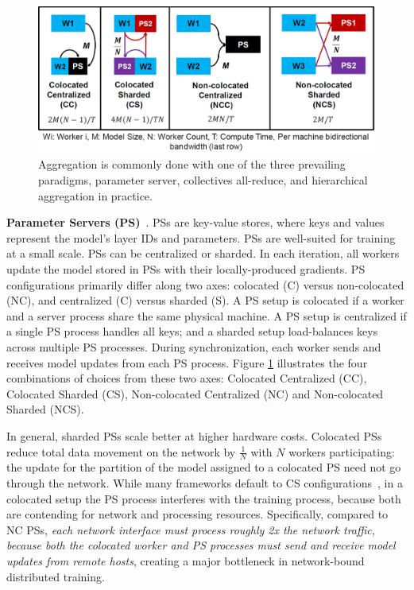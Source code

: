 \begin{figure}[t!]
	\centering
	\includegraphics[width=.7\linewidth, trim=2 3 3 3,clip]{Figures/pssetups.PNG}
	\caption{Aggregation is commonly done with one of the three prevailing paradigms, parameter server, collectives all-reduce, and hierarchical aggregation in practice.}
	\label{fig:pssetups}
\end{figure}

\noindent\textbf{Parameter Servers (PS)}~\cite{ps0,ps1,ps2,ps3, phubsocc, phubsysml, poseidon,cui2016geeps}. %
PSs are key-value stores, where keys and values represent the model's layer IDs and parameters. PSs are well-suited for training at a small scale. PSs can be centralized or sharded. In each iteration, all workers update the model stored in PSs with their locally-produced gradients. PS configurations primarily differ along two axes: colocated (C) versus non-colocated (NC), and centralized (C) versus sharded (S). %
A PS setup is colocated if a worker and a server process share the same physical machine. A PS setup is centralized if a single PS process handles all keys; and a sharded setup load-balances keys across multiple PS processes.
During synchronization, each worker sends and receives model updates from each PS process. Figure \ref{fig:pssetups} illustrates the four combinations of choices from these two axes: Colocated Centralized (CC), Colocated Sharded (CS), Non-colocated Centralized (NC) and Non-colocated Sharded (NCS).

In general, sharded PSs scale better at higher hardware costs. Colocated PSs reduce total data movement on the network by $\frac{1}{N}$ with $N$ workers participating: the update for the partition of the model assigned to a colocated PS need not go through the network. While many frameworks default to CS configurations~\cite{MXNetont0:online, Distribu25:online}, in a colocated setup the PS process interferes with the training process, because both are contending for network and processing resources. Specifically, compared to NC PSs, \textit{each network interface must process roughly 2x the network traffic, because both the colocated worker and PS processes must send and receive model updates from remote hosts}, creating a major bottleneck in network-bound distributed training. 

